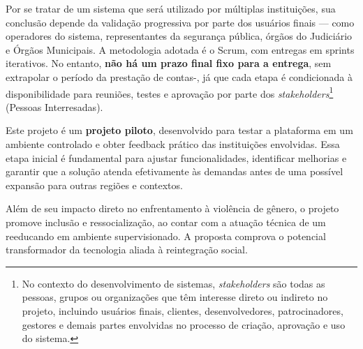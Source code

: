 \par Por se tratar de um sistema que será utilizado por múltiplas instituições, sua conclusão depende da validação progressiva por parte dos usuários finais — como operadores do sistema, representantes da segurança pública, órgãos do Judiciário e Órgãos Municipais. A metodologia adotada é o Scrum, com entregas em sprints iterativos. No entanto, \textbf{não há um prazo final fixo para a entrega}, sem extrapolar o período da prestação de contas-, já que cada etapa é condicionada à disponibilidade para reuniões, testes e aprovação por parte dos \textit{stakeholders}\footnote{No contexto do desenvolvimento de sistemas, \textit{stakeholders} são todas as pessoas, grupos ou organizações que têm interesse direto ou indireto no projeto, incluindo usuários finais, clientes, desenvolvedores, patrocinadores, gestores e demais partes envolvidas no processo de criação, aprovação e uso do sistema.} (Pessoas Interresadas).

\par Este projeto é um \textbf{projeto piloto}, desenvolvido para testar a plataforma em um ambiente controlado e obter feedback prático das instituições envolvidas. Essa etapa inicial é fundamental para ajustar funcionalidades, identificar melhorias e garantir que a solução atenda efetivamente às demandas antes de uma possível expansão para outras regiões e contextos.

\par Além de seu impacto direto no enfrentamento à violência de gênero, o projeto promove inclusão e ressocialização, ao contar com a atuação técnica de um reeducando em ambiente supervisionado. A proposta comprova o potencial transformador da tecnologia aliada à reintegração social.
